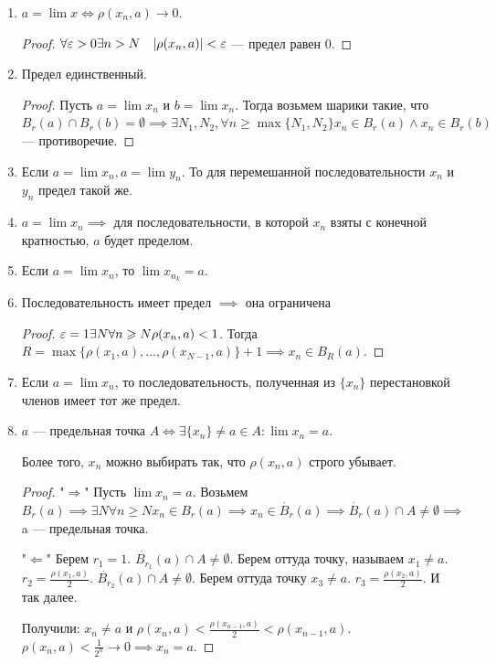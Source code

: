 \begin{properties}
    \begin{enumerate}
        \item $a = \lim x \iff \rho(x_n, a) \to 0$.
\begin{proof}
             $\forall \varepsilon > 0 \exists n > N\quad |\rho(x_n, a)| < \varepsilon$ --- предел равен 0.
\end{proof}
        \item Предел единственный. 
            \begin{proof}
                Пусть $a = \lim x_n$ и $b = \lim x_n$. Тогда возьмем шарики такие, что  $B_r(a) \cap B_r(b) = \emptyset \implies \exists N_1, N_2, \forall n \ge \max\{N_1, N_2\} x_n \in B_r(a) \land x_n \in B_r(b)$ --- противоречие.
            \end{proof}
        \item Если $a = \lim x_n, a = \lim y_n$. То для перемешанной последовательности $x_n$ и  $y_n$ предел такой же.
        \item  $a = \lim x_n \implies $ для последовательности, в которой $x_n$ взяты с конечной кратностью, $a$ будет пределом.
        \item Если $a = \lim x_n$, то  $\lim x_{n_k} = a$.
        \item Последовательность имеет предел $\implies$ она ограничена
             \begin{proof}
                $\varepsilon = 1 \exists N \forall n \geqslant N \rho(x_n, a) < 1$. Тогда $R = \max\{\rho(x_1, a), \ldots, \rho(x_{N-1}, a)\} + 1 \implies x_n \in B_R(a)$.
            \end{proof}
        \item Если $a = \lim x_n$, то последовательность, полученная из  $\{x_n\}$ перестановкой членов имеет тот же предел.
        \item $a$ --- предельная точка  $A \iff \exists \{x_n\} \neq a \in A\!: \lim x_n = a$.

            Более того,  $x_n$ можно выбирать так, что  $\rho(x_n, a)$ строго убывает.
            \begin{proof}
                "$\Rightarrow$" Пусть  $\lim x_n = a$. Возьмем  $B_r(a) \implies \exists N \forall n \ge N x_n \in B_r(a) \implies x_n \in \dot{B_r}(a) \implies \dot{B_r}(a) \cap A \neq \emptyset \implies$ a --- предельная точка.

                "$\Leftarrow$" Берем  $r_1 = 1$. $\dot{B_{r_1}}(a) \cap A \neq \emptyset$. Берем оттуда точку, называем  $x_1 \neq a$. $r_2 = \frac{\rho(x_1,a)}{2}$. $\dot{B_{r_2}}(a) \cap A \neq \emptyset$. Берем оттуда точку $x_3 \neq a$. $r_3 = \frac{\rho(x_2, a)}{2}$. И так далее.

                Получили: $x_n \neq a$ и  $\rho(x_n, a) < \frac{\rho(x_{n-1}, a)}{2} < \rho(x_{n-1}, a)$. $\rho(x_n, a) < \frac{1}{2^n} \to 0 \implies x_n = a$.
            \end{proof}
    \end{enumerate}
\end{properties}

